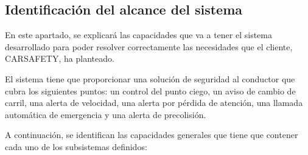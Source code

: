 \subsection {Identificación del alcance del sistema}
\par En este apartado, se explicará las capacidades que va a tener el sistema desarrollado para poder resolver correctamente las necesidades que el cliente, CARSAFETY, ha planteado.
\par El sistema tiene que proporcionar una solución de seguridad al conductor que cubra los siguientes puntos: un control del punto ciego, un aviso de cambio de carril, una alerta de velocidad, una alerta por pérdida de atención, una llamada automática de emergencia y una alerta de precolisión.
\par A continuación, se identifican las capacidades generales que tiene que contener cada uno de los subsistemas definidos:


